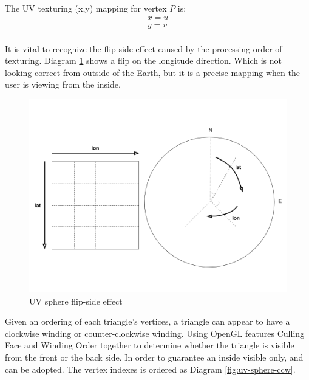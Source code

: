 The UV texturing (x,\;y) mapping for vertex $P$ is:
\[
\begin{array}{lr}
x = u\\
y = v\\
\end{array}
\]

It is vital to recognize the flip-side effect caused by the processing order of texturing. Diagram \ref{fig:uv-sphere-flip-side} shows a flip on the longitude direction. Which is not looking correct from outside of the Earth, but it is a precise mapping when the user is viewing from the inside.
 
\begin{figure}[H]
\caption{UV sphere flip-side effect}
\label{fig:uv-sphere-flip-side}
\centering
\includegraphics[width=\textwidth, keepaspectratio]{Figures/uv-sphere-flip-side.png}
\decoRule
\end{figure}

Given an ordering of each triangle's vertices, a triangle can appear to have a clockwise winding or counter-clockwise winding. Using OpenGL features Culling Face and Winding Order together to determine whether the triangle is visible from the front or the back side. In order to guarantee an inside visible only,  and  can be adopted. The vertex indexes is ordered as Diagram \ref{fig:uv-sphere-ccw}.

